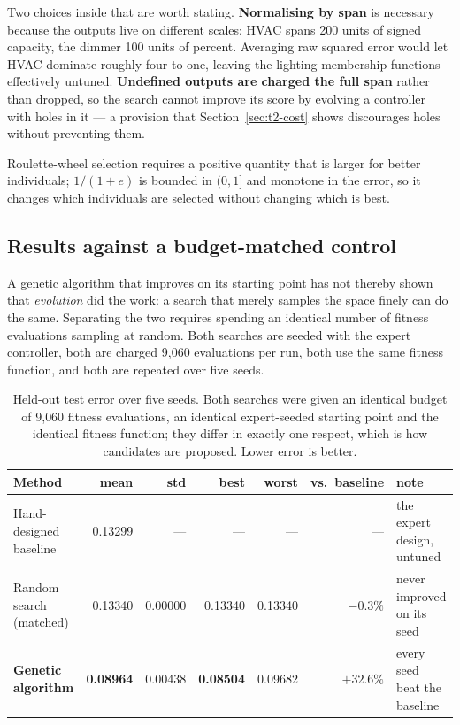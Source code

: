 Two choices inside that are worth stating. \textbf{Normalising by span} is
necessary because the outputs live on different scales: HVAC spans 200 units of
signed capacity, the dimmer 100 units of percent. Averaging raw squared error
would let HVAC dominate roughly four to one, leaving the lighting membership
functions effectively untuned. \textbf{Undefined outputs are charged the full
span} rather than dropped, so the search cannot improve its score by evolving a
controller with holes in it --- a provision that Section~\ref{sec:t2-cost} shows
discourages holes without preventing them.

Roulette-wheel selection requires a positive quantity that is larger for better
individuals; $1/(1+e)$ is bounded in $(0, 1]$ and monotone in the error, so it
changes which individuals are selected without changing which is best.

\subsection{Results against a budget-matched control}

A genetic algorithm that improves on its starting point has not thereby shown
that \emph{evolution} did the work: a search that merely samples the space
finely can do the same. Separating the two requires spending an identical number
of fitness evaluations sampling at random. Both searches are seeded with the
expert controller, both are charged 9{,}060 evaluations per run, both use the
same fitness function, and both are repeated over five seeds.

\begin{table}[t]
\caption{Held-out test error over five seeds. Both searches were given an
identical budget of 9{,}060 fitness evaluations, an identical expert-seeded
starting point and the identical fitness function; they differ in exactly one
respect, which is how candidates are proposed. Lower error is better.}
\label{tab:t2-ga}
\centering
\small
\begin{tabular}{@{}lrrrrrl@{}}
\toprule
\textbf{Method} & \textbf{mean} & \textbf{std} & \textbf{best} &
\textbf{worst} & \textbf{vs.\ baseline} & \textbf{note} \\
\midrule
Hand-designed baseline   & 0.13299 & ---     & ---     & ---     & ---
& the expert design, untuned \\
Random search (matched)  & 0.13340 & 0.00000 & 0.13340 & 0.13340 & $-0.3\%$
& never improved on its seed \\
\textbf{Genetic algorithm} & \textbf{0.08964} & 0.00438 & \textbf{0.08504}
& 0.09682 & \textbf{$+32.6\%$} & every seed beat the baseline \\
\bottomrule
\end{tabular}
\end{table}

